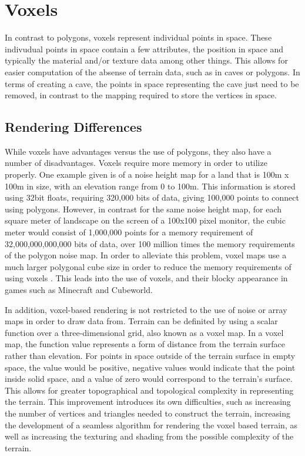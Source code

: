 \documentclass[10pt]{report}
\begin{document}
	
	\vspace{10pt}
	\let\clearpage\relax
	\chapter{Voxels}
	
		In contrast to polygons, voxels represent individual points in space. These indivudual points in space contain a few attributes, the position in space and typically the material and/or texture data among other things. This allows for easier computation of the absense of terrain data, such as in caves or polygons. In terms of creating a cave, the points in space representing the cave just need to be removed, in contrast to the mapping required to store the vertices in space. 
		
		\section{Rendering Differences}
		While voxels have advantages versus the use of polygons, they also have a number of disadvantages. Voxels require more memory in order to utilize properly. One example given is of a noise height map for a land that is 100m x 100m in size, with an elevation range from 0 to 100m. This information is stored using 32bit floats, requiring 320,000 bits of data, giving 100,000 points to connect using polygons. However, in contrast for the same noise height map, for each square meter of landscape on the screen of a 100x100 pixel monitor, the cubic meter would consist of 1,000,000 points for a memory requirement of 32,000,000,000,000 bits of data, over 100 million times the memory requirements of the polygon noise map. In order to alleviate this problem, voxel maps use a much larger polygonal cube size in order to reduce the memory requirements of using voxels \cite{high-level-voxel}. This leads into the use of voxels, and their blocky appearance in games such as Minecraft and Cubeworld.
		
		In addition, voxel-based rendering is not restricted to the use of noise or array maps in order to draw data from. Terrain can be definited by using a scalar function over a three-dimensional grid, also known as a voxel map. In a voxel map, the function value represents a form of distance from the terrain surface rather than elevation. For points in space outside of the terrain surface in empty space, the value would be positive, negative values would indicate that the point inside solid space, and a value of zero would correspond to the terrain's surface. This allows for greater topographical and topological complexity in representing the terrain. This improvement introduces its own difficulties, such as increasing the number of vertices and triangles needed to construct the terrain, increasing the development of a seamless algorithm for rendering the voxel based terrain, as well as increasing the texturing and shading from the possible complexity of the terrain. 
		
\end{document}
